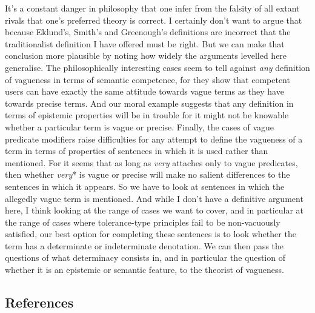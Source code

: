 \documentclass[
  11pt,
  letterpaper,
  DIV=11,
  numbers=noendperiod,
  twoside]{scrartcl}
\begin{document}
It's a constant danger in philosophy that one infer from the falsity of
all extant rivals that one's preferred theory is correct. I certainly
don't want to argue that because Eklund's, Smith's and Greenough's
definitions are incorrect that the traditionalist definition I have
offered must be right. But we can make that conclusion more plausible by
noting how widely the arguments levelled here generalise. The
philosophically interesting cases seem to tell against \emph{any}
definition of vagueness in terms of semantic competence, for they show
that competent users can have exactly the same attitude towards vague
terms as they have towards precise terms. And our moral example suggests
that any definition in terms of epistemic properties will be in trouble
for it might not be knowable whether a particular term is vague or
precise. Finally, the cases of vague predicate modifiers raise
difficulties for any attempt to define the vagueness of a term in terms
of properties of sentences in which it is used rather than mentioned.
For it seems that as long as \emph{very} attaches only to vague
predicates, then whether \emph{very}* is vague or precise will make no
salient differences to the sentences in which it appears. So we have to
look at sentences in which the allegedly vague term is mentioned. And
while I don't have a definitive argument here, I think looking at the
range of cases we want to cover, and in particular at the range of cases
where tolerance-type principles fail to be non-vacuously satisfied, our
best option for completing these sentences is to look whether the term
has a determinate or indeterminate denotation. We can then pass the
questions of what determinacy consists in, and in particular the
question of whether it is an epistemic or semantic feature, to the
theorist of vagueness.

\subsection*{References}\label{references}
\end{document}
